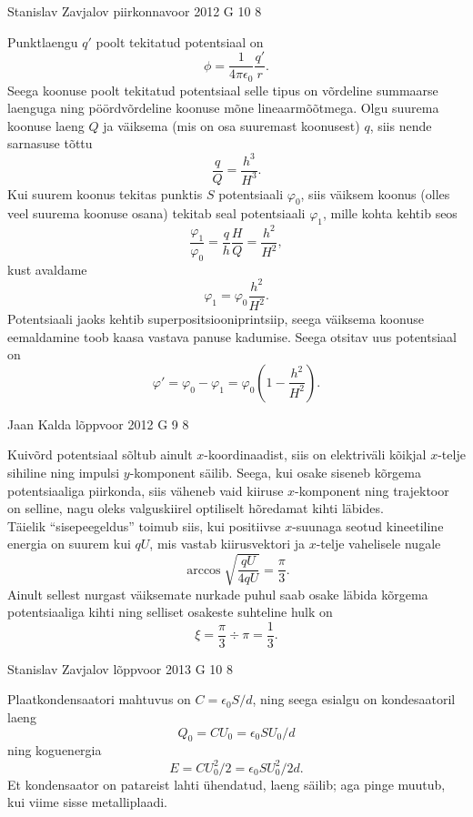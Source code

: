 \documentclass[11pt, twoside]{article}
\begin{document}
{%
{Stanislav Zavjalov} %
{piirkonnavoor} %
{2012} %
{G 10} %
{8} %
{

\ifSolution
Punktlaengu $q'$ poolt tekitatud potentsiaal on
\[
\phi = \frac{1}{4 \pi \epsilon_0} \frac{q'}{r}.
\]
Seega koonuse poolt tekitatud potentsiaal selle tipus on võrdeline summaarse laenguga ning pöördvõrdeline koonuse mõne lineaarmõõtmega. Olgu suurema koonuse laeng $Q$ ja väiksema (mis on osa suuremast koonusest) $q$, siis nende sarnasuse tõttu
\[
\frac{q}{Q} = \frac{h^3}{H^3}.
\]
Kui suurem koonus tekitas punktis $S$ potentsiaali $\varphi_0$, siis väiksem koonus (olles veel suurema koonuse osana) tekitab seal potentsiaali $\varphi_1$, mille kohta kehtib seos
\[
\frac{\varphi_1}{\varphi_0} = \frac{q}{h} \frac{H}{Q} = \frac{h^2}{H^2},
\]
kust avaldame
\[
\varphi_1 = \varphi_0 \frac{h^2}{H^2}.
\]
Potentsiaali jaoks kehtib superpositsiooniprintsiip, seega väiksema koonuse eemaldamine toob kaasa vastava panuse kadumise. Seega otsitav uus potentsiaal on
\[
\varphi' = \varphi_0 - \varphi_1 = \varphi_0 \left( 1 - \frac{h^2}{H^2}\right).
\]
\fi
}

{Jaan Kalda} %
{lõppvoor} %
{2012} %
{G 9} %
{8} %
{

\ifSolution
\osa Kuivõrd potentsiaal sõltub ainult $x$-koordinaadist, siis on elektriväli kõikjal $x$-telje sihiline ning
impulsi $y$-komponent säilib. Seega, kui osake siseneb kõrgema potentsiaaliga piirkonda, siis 
väheneb vaid kiiruse $x$-komponent ning
trajektoor on selline, nagu oleks valguskiirel optiliselt hõredamat kihti läbides.\\
\osa Täielik \enquote{sisepeegeldus} toimub siis, kui positiivse $x$-suunaga 
seotud kineetiline energia on suurem kui $qU$, mis vastab kiirusvektori 
ja $x$-telje vahelisele nugale
\[
\arccos \sqrt{\frac {qU}{4qU}}=\frac \pi 3.
\]
Ainult sellest nurgast väiksemate nurkade puhul saab osake läbida kõrgema 
potentsiaaliga kihti ning selliset osakeste suhteline hulk on
\[
\xi = \frac \pi 3 \div \pi = \frac 13.
\]
\fi
}

{Stanislav Zavjalov} %
{lõppvoor} %
{2013} %
{G 10} %
{8} %
{

\ifSolution
Plaatkondensaatori mahtuvus on $C = \epsilon_0 S / d$, ning seega esialgu on kondesaatoril laeng $$Q_0 = C U_0 = \epsilon_0 S U_0/ d$$ ning koguenergia $$E = C U_0^2 / 2 = \epsilon_0 S U_0^2/ 2 d.$$Et kondensaator on patareist lahti ühendatud, laeng säilib; aga pinge muutub, kui viime sisse metalliplaadi.

}}
\end{document}
